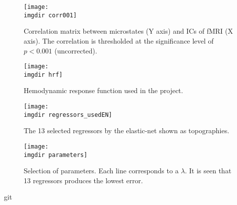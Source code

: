 \documentclass{article}
\newcommand{\imgdir}{Images/} %
\begin{document}
\begin{figure}[!ht]
    \centering
    \texttt{[image: \\imgdir corr001]}
    \caption{Correlation matrix between microstates (Y axis) and ICs of fMRI (X axis). The correlation is thresholded at the significance level of $p<0.001$ (uncorrected).}
    \label{fig:corr001}
\end{figure}

\begin{figure}[!ht]
    \centering
    \texttt{[image: \\imgdir hrf]}
    \caption{Hemodynamic response function used in the project.}
    \label{fig:hrf}
\end{figure}

\begin{figure}[!ht]
    \centering
    \texttt{[image: \\imgdir regressors\_usedEN]}
    \caption{The 13 selected regressors by the elastic-net shown as topographies.}
    \label{fig:regressors_spatial}
\end{figure}

\begin{figure}[!ht]
    \centering
    \texttt{[image: \\imgdir parameters]}
    \caption{Selection of parameters. Each line corresponds to a $\lambda$. It is seen that 13 regressors produces the lowest error.}
    \label{fig:parameters}
\end{figure}



\begin{table}[H]
\caption{Maximum Correlation of single microstate time course with DMN IC.}
\label{table:correlation}
\centering
{}
\end{table}

\begin{table}[H]
\caption{Robustness (similarity).}
\label{table:similarity}
\centering
{}
\end{table}git
\end{document}
